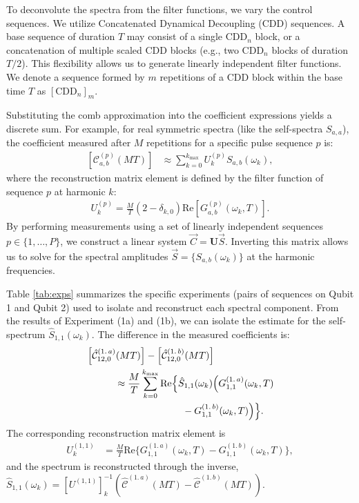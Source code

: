 \documentclass[%
 reprint,
superscriptaddress,
 amsmath,amssymb,
 aps,
pra,
]{revtex4-2}
\begin{document}
To deconvolute the spectra from the filter functions, we vary the control sequences. We utilize Concatenated Dynamical Decoupling (CDD) sequences. A base sequence of duration $T$ may consist of a single $\text{CDD}_n$ block, or a concatenation of multiple scaled CDD blocks (e.g., two $\text{CDD}_n$ blocks of duration $T/2$). This flexibility allows us to generate linearly independent filter functions. We denote a sequence formed by $m$ repetitions of a CDD block within the base time $T$ as $[\text{CDD}_n]_m$.

Substituting the comb approximation into the coefficient expressions yields a discrete sum. For example, for real symmetric spectra (like the self-spectra $S_{a,a}$), the coefficient measured after $M$ repetitions for a specific pulse sequence $p$ is:
\begin{align}
\label{eq::gencoeff}
    \left[\mathcal{C}^{(p)}_{a,b}(MT)\right]&\approx \sum_{k=0}^{k_\text{max}} U^{(p)}_{k} S_{a,b}(\omega_k),
\end{align}
where the reconstruction matrix element is defined by the filter function of sequence $p$ at harmonic $k$:
\begin{align}
    U^{(p)}_{k}=\frac{M}{T}(2-\delta_{k,0})\text{Re}\left[G^{(p)}_{a,b}(\omega_k,T)\right].
\end{align}
By performing measurements using a set of linearly independent sequences $p \in \{1, \dots, P\}$, we construct a linear system $\vec{C} = \mathbf{U} \vec{S}$. Inverting this matrix allows us to solve for the spectral amplitudes $\vec{S} = \{S_{a,b}(\omega_k)\}$ at the harmonic frequencies. 

Table \ref{tab:exps} summarizes the specific experiments (pairs of sequences on Qubit 1 and Qubit 2) used to isolate and reconstruct each spectral component. From the results of Experiment (1a) and (1b), we can isolate the estimate for the self-spectrum $\hat{S}_{1,1}(\omega_k)$. The difference in the measured coefficients is:
\begin{align}
    &\left[\hat{\mathcal{C}}_{12,0}^{(1.\,a)}(MT)\right]-\left[\hat{\mathcal{C}}_{12,0}^{(1.\,b)}(MT)\right]\notag\\
    &\qquad\quad\approx\frac{M}{T}\sum_{k=0}^{k_{\max}}\text{Re}\Big\{\hat{S}_{1,1}(\omega_k)\Big(G_{1,1}^{(1.\,a)}(\omega_k, T) \notag\\
    &\qquad\qquad\qquad\qquad\qquad- G_{1,1}^{(1.\,b)}(\omega_k, T)\Big)\Big\}.
\end{align}
The corresponding reconstruction matrix element is
\begin{align}
    U_{k}^{(1,1)}&=\frac{M}{T}\text{Re}\Big\{G_{1,1}^{(1.\,a)}(\omega_k, T) - G_{1,1}^{(1.\,b)}(\omega_k, T)\Big\},
\end{align}
and the spectrum is reconstructed through the inverse, $\hat{S}_{1,1}(\omega_k) = [U^{(1,1)}]^{-1}_{k} (\hat{\mathcal{C}}^{(1.\,a)}(MT) - \hat{\mathcal{C}}^{(1.\,b)}(MT))$.
\end{document}
